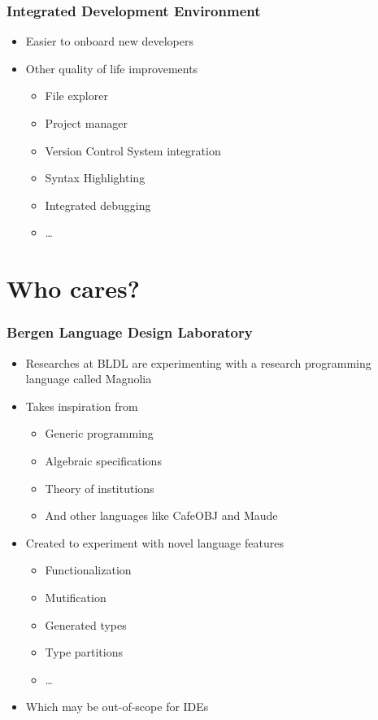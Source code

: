 \begin{frame}
  \frametitle{Integrated Development Environment}
  \begin{itemize}
    \pause
    \item Easier to onboard new developers
    \item Other quality of life improvements
    \pause
    \begin{itemize}
      \item File explorer
      \item Project manager
      \item Version Control System integration
      \item Syntax Highlighting
      \item Integrated debugging
      \item \dots
    \end{itemize}
  \end{itemize}
\end{frame}

\section{Who cares?}
\SectionPage

\begin{frame}
  \frametitle{Bergen Language Design Laboratory}
  \begin{itemize}
    \item Researches at BLDL are experimenting with a research programming
      language called Magnolia
    \pause
    \item Takes inspiration from
    \begin{itemize}
      \item Generic programming
      \item Algebraic specifications
      \item Theory of institutions
      \item And other languages like CafeOBJ and Maude
    \end{itemize}
    \item Created to experiment with novel language features
    \pause
    \begin{itemize}
      \item Functionalization
      \item Mutification
      \item Generated types
      \item Type partitions
      \item \dots
      \pause
    \end{itemize}
  \item Which may be out-of-scope for IDEs
  \end{itemize}
\end{frame}

